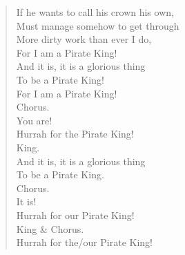 \documentclass[11pt]{article}
\begin{document}
\begin{verse}
If he wants to call his crown his own,\\
Must manage somehow to get through\\
More dirty work than ever I do,\\
\vspace*{1em}
For I am a Pirate King!\\
And it is, it is a glorious thing\\
To be a Pirate King!\\
\vspace*{1em}
For I am a Pirate King!\\
Chorus.\\
You are!\\
Hurrah for the Pirate King!\\
King.\\
And it is, it is a glorious thing\\
To be a Pirate King.\\
Chorus.\\
It is!\\
Hurrah for our Pirate King!\\
King \& Chorus.\\
Hurrah for the/our Pirate King!\\
\end{verse}
\clearpage
\end{document}
